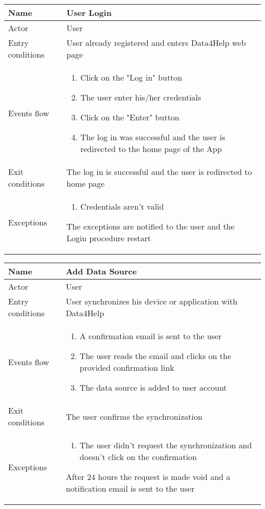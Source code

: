 \FloatBarrier
\begin{table}[h!]
\begin{tabular}{|l|p{12cm}|}
\hline
Name             & User Login \\ \hline
Actor            & User \\ \hline
Entry conditions & User already registered and enters Data4Help web page\\ \hline
Events flow      & \begin{enumerate}
\item Click on the "Log in" button
\item The user enter his/her credentials
\item Click on the "Enter" button
\item The log in was successful and the user is redirected to the home page of the App
\end{enumerate} \\ \hline
Exit conditions  & The log in is successful and the user is redirected to home page \\ \hline
Exceptions       & \begin{enumerate}
\item Credentials aren't valid
\end{enumerate} The exceptions are notified to the user and the Login procedure restart \\ \hline
\end{tabular}
\end{table}

\begin{table}[h!]
\begin{tabular}{|l|p{12cm}|}
\hline
Name             & Add Data Source \\ \hline
Actor            & User \\ \hline
Entry conditions & User synchronizes his device or application with Data4Help \\ \hline
Events flow      & \begin{enumerate}
\item A confirmation email is sent to the user
\item The user reads the email and clicks on the provided confirmation link
\item The data source is added to user account 
\end{enumerate} \\ \hline
Exit conditions  & The user confirms the synchronization \\ \hline
Exceptions       & \begin{enumerate}
\item The user didn't request the synchronization and doesn't click on the confirmation
\end{enumerate} After 24 hours the request is made void and a notification email 
is sent to the user \\ \hline 
\end{tabular} 
\end{table}

